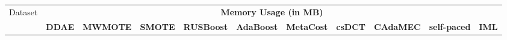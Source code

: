 \begin{table}[h]
    \footnotesize
    \begin{tabular}{|p{}<{\centering}|p{}<{\centering}|p{}<{\centering}|p{}<{\centering}|p{}<{\centering}|p{}<{\centering}|p{}<{\centering}|p{}<{\centering}|p{}<{\centering}|p{}<{\centering}|p{}<{\centering}|}
    \hline
    \multirow{2}{*}{Dataset} & \multicolumn{10}{c|}{\textbf{Memory Usage (in MB)}}    \\ \cline{2-11} 
                             & \tiny\textbf{DDAE} & \tiny\textbf{MWMOTE} & \tiny\textbf{SMOTE} & \tiny\textbf{RUSBoost} & \tiny\textbf{AdaBoost} & \tiny\textbf{MetaCost} & \tiny\textbf{csDCT} & \tiny\textbf{CAdaMEC} &
                            \tiny\textbf{self-paced} & \tiny\textbf{IML}\\ \hline
                          

\end{tabular}
\end{table}
